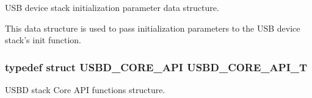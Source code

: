 U\-S\-B device stack initialization parameter data structure. 

This data structure is used to pass initialization parameters to the U\-S\-B device stack's init function. \hypertarget{group__USBD__Core_ga6a53e8395d1c68f98d18ca4a49b75baa}{
\subsubsection[{U\-S\-B\-D\-\_\-\-C\-O\-R\-E\-\_\-\-A\-P\-I\-\_\-\-T}]{\setlength{\rightskip}{0pt plus 5cm}typedef struct {\bf U\-S\-B\-D\-\_\-\-C\-O\-R\-E\-\_\-\-A\-P\-I}  {\bf U\-S\-B\-D\-\_\-\-C\-O\-R\-E\-\_\-\-A\-P\-I\-\_\-\-T}}}\label{group__USBD__Core_ga6a53e8395d1c68f98d18ca4a49b75baa}


U\-S\-B\-D stack Core A\-P\-I functions structure. 

